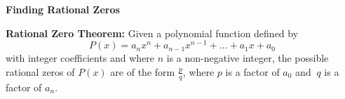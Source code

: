 \begin{center}
\textbf{Finding Rational Zeros 
}
\end{center}

\vspce 

\textbf{ Rational Zero Theorem:} Given a polynomial function defined by \[ {P(x) = a_nx^n+a_{n-1}x^{n-1}+\ldots +a_1x+a_0}\] with integer coefficients and where ${n}$ is a non-negative integer, the possible rational zeros of $ {P(x) }$ are of the form $ {\displaystyle \frac{p}{q}}$, where ${p}$ is a factor of $ {a_0}$ and $\ {q}$ is a factor of ${a_n}$. 

